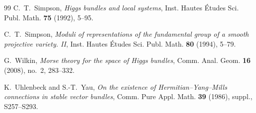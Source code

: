 \documentclass[11pt,reqno]{amsart}
\theoremstyle{definition}
\theoremstyle{remark}
\begin{document}
\begin{thebibliography}{99}
C.~T.~Simpson,
\emph{Higgs bundles and local systems},
Inst. Hautes \'Etudes Sci. Publ. Math. \textbf{75} (1992), 5--95.

C.~T.~Simpson,
\emph{Moduli of representations of the fundamental group of a smooth projective variety. II},
Inst. Hautes \'Etudes Sci. Publ. Math. \textbf{80} (1994), 5--79.

G.~Wilkin,
\emph{Morse theory for the space of Higgs bundles},
Comm. Anal. Geom. \textbf{16} (2008), no.~2, 283--332.

K.~Uhlenbeck and S.-T.~Yau,
\emph{On the existence of Hermitian--Yang--Mills connections in stable vector bundles},
Comm. Pure Appl. Math. \textbf{39} (1986), suppl., S257--S293.

\end{thebibliography}

\pagebreak
\end{document}
